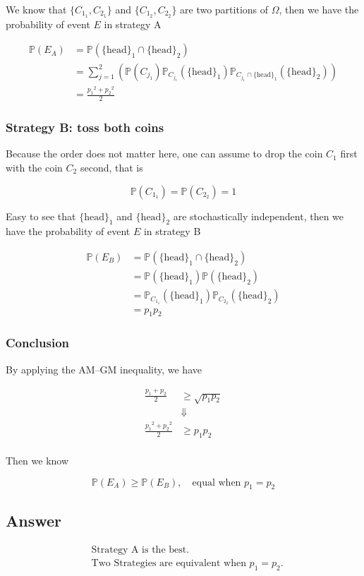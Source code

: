 \documentclass[12pt]{article}
\newcommand{\bP}{\mathbb{P}}
\begin{document}
\begin{enumerate}[label={},leftmargin=0in]
			We know that $\{C_{1_1},C_{2_1}\}$ and $\{C_{1_2},C_{2_2}\}$ are two partitions of $\Omega$, then we have the probability of event $E$ in strategy A
			
			\[
			\begin{aligned}
				\bP(E_A) &= \bP(\{\mathrm{head}\}_1\cap \{\mathrm{head}\}_2)\\
				&= \sum_{j=1}^2\left(\bP(C_{j_1})\bP_{C_{j_1}}(\{\mathrm{head}\}_1)\bP_{C_{j_1}\cap \{\mathrm{head}\}_1}(\{\mathrm{head}\}_2)\right)\\
				&= \frac{{p_1}^2 + {p_2}^2}{2}
			\end{aligned}
			\]
			
			\subsubsection*{Strategy B: toss both coins}
			
			Because the order does not matter here, one can assume to drop the coin $C_1$ first with the coin $C_2$ second, that is
			
			\[\bP(C_{1_1}) = \bP(C_{2_2}) = 1\]
			
			Easy to see that $\{\mathrm{head}\}_1$ and $\{\mathrm{head}\}_2$ are stochastically independent, then we have the probability of event $E$ in strategy B
			
			\[
			\begin{aligned}
				\bP(E_B) &= \bP(\{\mathrm{head}\}_1\cap \{\mathrm{head}\}_2)\\
				&= \bP(\{\mathrm{head}\}_1)\bP(\{\mathrm{head}\}_2)\\
				&= \bP_{C_{1_1}}(\{\mathrm{head}\}_1)\bP_{C_{2_2}}(\{\mathrm{head}\}_2)\\
				&= p_1p_2
			\end{aligned}
			\]
			
			\subsubsection*{Conclusion}
			
			By applying the AM–GM inequality, we have
			
			\[
			\begin{aligned}
				\frac{p_1 + p_2}{2}&\ge \sqrt{p_1p_2}\\
				&\Downarrow\\
				\frac{{p_1}^2 + {p_2}^2}{2}&\ge p_1p_2\\
			\end{aligned}
			\]
			
			Then we know
			
			\[\bP(E_A) \ge \bP(E_B),\quad \text{equal when } p_1 = p_2\]
			
		\subsection*{Answer}
		
			\[\boxed{
				\begin{aligned}
					&\text{Strategy A is the best.}\\
					&\text{Two Strategies are equivalent when $p_1 = p_2$.}
				\end{aligned}
			}\]
	
	\end{enumerate}
\end{document}
